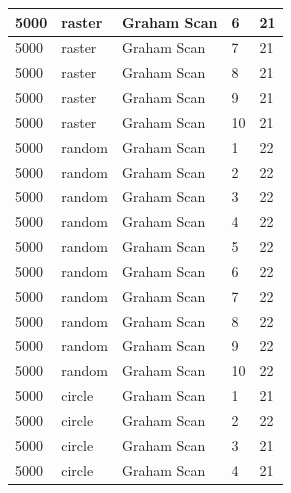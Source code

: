 \documentclass[12pt]{article}
\begin{document}
\begin{longtable}{|l|l|l|l|l|}
5000         & raster            & Graham Scan & 6          & 21                            \\ \hline
5000         & raster            & Graham Scan & 7          & 21                            \\ \hline
5000         & raster            & Graham Scan & 8          & 21                            \\ \hline
5000         & raster            & Graham Scan & 9          & 21                            \\ \hline
5000         & raster            & Graham Scan & 10         & 21                            \\ \hline
5000         & random            & Graham Scan & 1          & 22                            \\ \hline
5000         & random            & Graham Scan & 2          & 22                            \\ \hline
5000         & random            & Graham Scan & 3          & 22                            \\ \hline
5000         & random            & Graham Scan & 4          & 22                            \\ \hline
5000         & random            & Graham Scan & 5          & 22                            \\ \hline
5000         & random            & Graham Scan & 6          & 22                            \\ \hline
5000         & random            & Graham Scan & 7          & 22                            \\ \hline
5000         & random            & Graham Scan & 8          & 22                            \\ \hline
5000         & random            & Graham Scan & 9          & 22                            \\ \hline
5000         & random            & Graham Scan & 10         & 22                            \\ \hline
5000         & circle            & Graham Scan & 1          & 21                            \\ \hline
5000         & circle            & Graham Scan & 2          & 22                            \\ \hline
5000         & circle            & Graham Scan & 3          & 21                            \\ \hline
5000         & circle            & Graham Scan & 4          & 21                            \\ \hline

\end{longtable}
\end{document}
